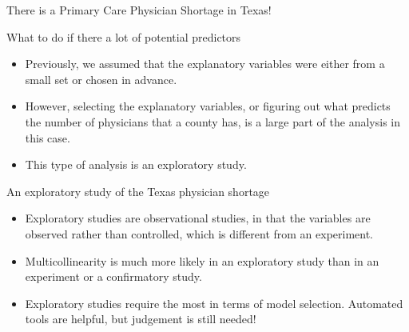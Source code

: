 \documentclass{beamer}\usepackage[]{graphicx}\usepackage[]{color}
\makeatletter
\newcommand{\hlopt}[1]{\textcolor[rgb]{1,0.894,0.769}{#1}}%
\newcommand{\hlstd}[1]{\textcolor[rgb]{1,0.894,0.769}{#1}}%
\newcommand{\hlkwb}[1]{\textcolor[rgb]{0.804,0.776,0.451}{#1}}%
\newcommand{\hlkwd}[1]{\textcolor[rgb]{1,0.78,0.769}{#1}}%
\newenvironment{kframe}{%
 \def\at@end@of@kframe{}%
 \ifinner\ifhmode%
  \def\at@end@of@kframe{\end{minipage}}%
  \begin{minipage}{\columnwidth}%
 \fi\fi%
 \def\FrameCommand##1{\hskip\@totalleftmargin \hskip-\fboxsep
 \colorbox{shadecolor}{##1}\hskip-\fboxsep
     \hskip-\linewidth \hskip-\@totalleftmargin \hskip\columnwidth}%
 \MakeFramed {\advance\hsize-\width
   \@totalleftmargin\z@ \linewidth\hsize
   \@setminipage}}%
 {\par\unskip\endMakeFramed%
 \at@end@of@kframe}
\newenvironment{knitrout}{}{} %
\makeatother
\begin{document}
\begin{darkframes}
\begin{frame}{There is a Primary Care Physician Shortage in Texas!}
      \lc %
    \end{frame}

    \begin{frame}[fragile]{What to do if there a lot of potential predictors}
    \fontsize{8}{8}\selectfont
      \begin{itemize}[<+->]
        \item Previously, we assumed that the explanatory variables were either from a small set or chosen in advance.
        \item However, selecting the explanatory variables, or figuring out what predicts the number of physicians that a county has, is a large part of the analysis in this case.
        \item This type of analysis is an exploratory study.
      \end{itemize} 
    \end{frame}

    \begin{frame}[fragile]{An exploratory study of the Texas physician shortage}
      \begin{itemize}[<+->]
        \item Exploratory studies are observational studies, in that the variables are observed rather than controlled, which is different from an experiment.
        \item Multicollinearity is much more likely in an exploratory study than in an experiment or a confirmatory study.
        \item Exploratory studies require the most in terms of model selection. Automated tools are helpful, but judgement is still needed!
      \end{itemize} 
    \end{frame}

\end{darkframes}
\end{document}
